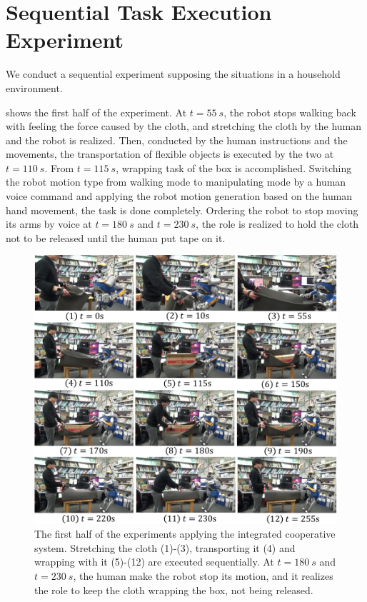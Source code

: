 \section{Sequential Task Execution Experiment}
\label{sec:ex}
We conduct a sequential experiment supposing the situations in a household environment.\par
{} shows the first half of the experiment. At \(t=\SI{55}{s}\), the robot stops walking back with feeling the force caused by the cloth, and stretching the cloth by the human and the robot is realized. Then, conducted by the human instructions and the movements, the transportation of flexible objects is executed by the two at \(t=\SI{110}{s}\). From \(t=\SI{115}{s}\), wrapping task of the box is accomplished. Switching the robot motion type from walking mode to manipulating mode by a human voice command and applying the robot motion generation based on the human hand movement, the task is done completely. Ordering the robot to stop moving its arms by voice at \(t=\SI{180}{s}\) and \(t=\SI{230}{s}\), the role is realized to hold the cloth not to be released until the human put tape on it.

\begin{figure}[htbp]
  \begin{center}
    \includegraphics[width=1.00\columnwidth]{figs/demo_all_01}
    \caption{The first half of the experiments applying the integrated cooperative system. Stretching the cloth (1)-(3), transporting it (4) and wrapping with it (5)-(12) are executed sequentially. At \(t=\SI{180}{s}\) and \(t=\SI{230}{s}\), the human make the robot stop its motion, and it realizes the role to keep the cloth wrapping the box, not being released.}
    \label{figure:demo_all_1}
  \end{center}
\end{figure}


